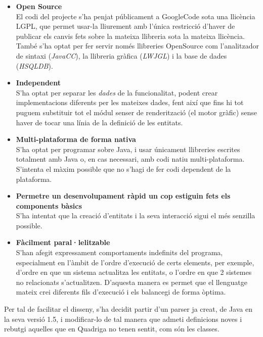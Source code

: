   \begin{itemize}
    \item {\bf Open Source} \hfill \\
      El codi del projecte s'ha penjat públicament a GoogleCode sota una llicència LGPL, que permet usar-la lliurement amb l'única restricció d'haver de publicar els canvis fets sobre la mateixa llibreria sota la mateixa llicència. També s'ha optat per fer servir només llibreries OpenSource com l'analitzador de sintaxi ({\em JavaCC}), la llibreria gràfica ({\em LWJGL}) i la base de dades ({\em HSQLDB}).
      
    \item {\bf Independent} \hfill \\
      S'ha optat per separar les {\em dades} de la funcionalitat, podent crear implementacions diferents per les mateixes dades, fent així que fins hi tot puguem substituir tot el módul senser de renderització (el motor gràfic) sense haver de tocar una línia de la definició de les entitats.
      
    \item {\bf Multi-plataforma de forma nativa} \hfill \\
      S'ha optat per programar sobre Java, i usar únicament llibreries escrites totalment amb Java o, en cas necessari, amb codi natiu multi-plataforma. S'intenta el màxim possible que no s'hagi de fer codi dependent de la plataforma.
      
    \item {\bf Permetre un desenvolupament ràpid un cop estiguin fets els components bàsics} \hfill \\
      S'ha intentat que la creació d'entitats i la seva interacció sigui el més senzilla possible.
      
    \item {\bf Fàcilment paral·lelitzable} \hfill \\
      S'han afegit expressament comportaments indefinits del programa, especialment en l'àmbit de l'ordre d'execució de certs elements, per exemple, d'ordre en que un sistema actualitza les entitats, o l'ordre en que 2 sistemes no relacionats s'actualitzen. D'aquesta manera es permet que el llenguatge mateix crei diferents fils d'execució i els balancegi de forma òptima.
  \end{itemize}

  Per tal de facilitar el disseny, s'ha decidit partir d'un parser ja creat, de Java en la seva versió 1.5, i modificar-lo de tal manera que admeti definicions noves i rebutgi aquelles que en Quadriga no tenen sentit, com són les classes.
  
